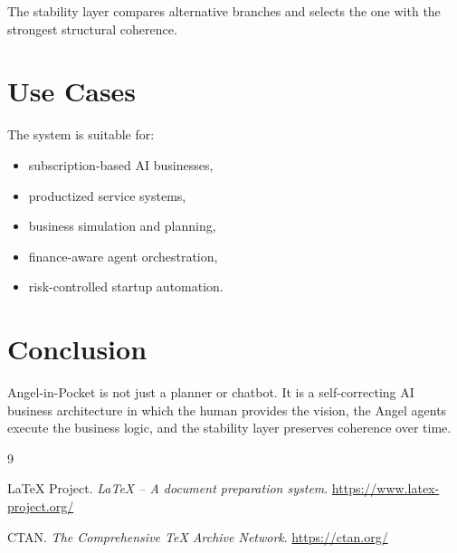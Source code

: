 \documentclass[11pt,a4paper]{article}
\begin{document}
The stability layer compares alternative branches and selects the one with the strongest structural coherence.

\section{Use Cases}

The system is suitable for:
\begin{itemize}[leftmargin=1.2cm]
    \item subscription-based AI businesses,
    \item productized service systems,
    \item business simulation and planning,
    \item finance-aware agent orchestration,
    \item risk-controlled startup automation.
\end{itemize}

\section{Conclusion}

Angel-in-Pocket is not just a planner or chatbot. It is a self-correcting AI business architecture in which the human provides the vision, the Angel agents execute the business logic, and the stability layer preserves coherence over time.


\begin{thebibliography}{9}

LaTeX Project. \emph{LaTeX -- A document preparation system}. \url{https://www.latex-project.org/}

CTAN. \emph{The Comprehensive TeX Archive Network}. \url{https://ctan.org/}

\end{thebibliography}
\end{document}
